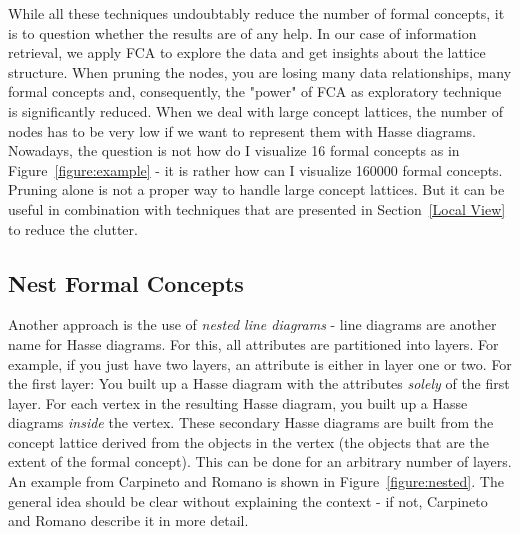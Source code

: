 \documentclass[11pt]{report}
\begin{document}
	While all these techniques undoubtably reduce the number of formal concepts, it is to question whether the results are of any help. In our case of information retrieval, we apply FCA to explore the data and get insights about the lattice structure. When pruning the nodes, you are losing many data relationships, many formal concepts and, consequently, the "power" of FCA as exploratory technique is significantly reduced. When we deal with large concept lattices, the number of nodes has to be very low if we want to represent them with Hasse diagrams. Nowadays, the question is not how do I visualize 16 formal concepts as in Figure~\ref{figure:example} - it is rather how can I visualize 160000 formal concepts.\\
	
	Pruning alone is not a proper way to handle large concept lattices. But it can be useful in combination with techniques that are presented in Section~\ref{Local View} to reduce the clutter.
\subsection{Nest Formal Concepts}	

Another approach is the use of \textit{nested line diagrams} - line diagrams are another name for Hasse diagrams. For this, all attributes are partitioned into layers. For example, if you just have two layers, an attribute is either in layer one or two. For the first layer: You built up a Hasse diagram with the attributes \textit{solely} of the first layer. For each vertex in the resulting Hasse diagram, you built up a Hasse diagrams \textit{inside} the vertex. These secondary Hasse diagrams are built from the concept lattice derived from the objects in the vertex (the objects that are the extent of the formal concept). This can be done for an arbitrary number of layers. An example from Carpineto and Romano \cite{carpineto2004concept} is shown in Figure~\ref{figure:nested}. The general idea should be clear without explaining the context - if not, Carpineto and Romano \cite{carpineto2004concept} describe it in more detail. \\
\end{document}
